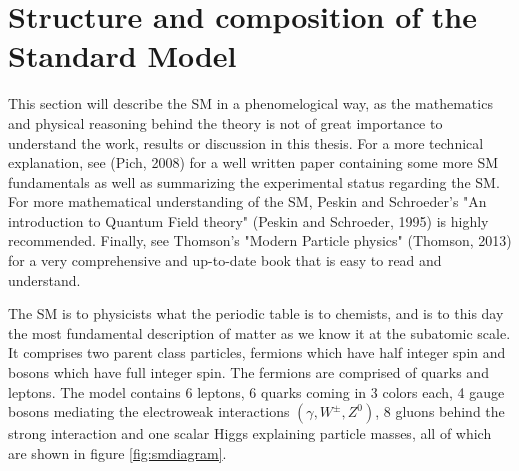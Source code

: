 \section{Structure and composition of the Standard Model}
This section will describe the SM in a phenomelogical way, as the mathematics and 
physical reasoning behind the theory is not of great 
importance to understand the work, results or discussion in this thesis. For a more 
technical explanation, see (Pich, 2008)\cite{Pich:819632} for a 
well written paper containing some more SM fundamentals as well as summarizing the 
experimental status regarding the SM.
For more mathematical understanding of the SM, Peskin and Schroeder's "An introduction 
to Quantum Field theory" (Peskin and Schroeder, 1995)\cite{Peskin:1995ev}
 is highly recommended. Finally, see Thomson's "Modern Particle physics" (Thomson, 2013)
 \cite{Thomson:2013zua} for a very comprehensive and up-to-date book that is easy to read and 
 understand. \par
The SM is to physicists what the periodic table is to chemists, and is to this day the most fundamental description of 
matter as we know it at the subatomic scale. It comprises two parent class particles, fermions which have half integer 
spin and bosons which have full integer spin. The fermions are comprised of quarks and leptons. The model contains 
6 leptons, 6 quarks coming in 3 colors each, 4 gauge bosons mediating the electroweak interactions $(\gamma, W^{\pm}, Z^{0})$, 
8 gluons behind the strong interaction and one 
scalar Higgs explaining particle masses, all of which are shown in figure \ref{fig:smdiagram}.



